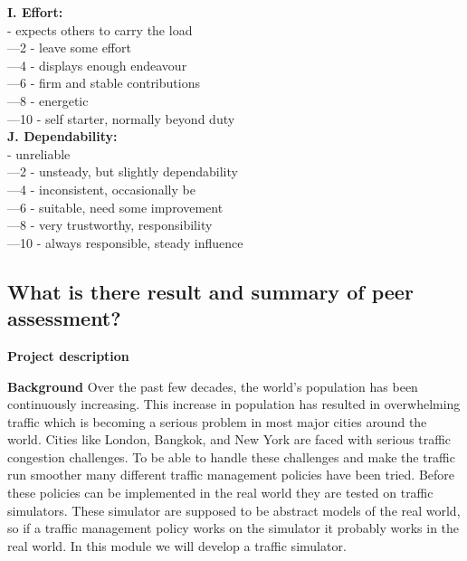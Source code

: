 \documentclass[11pt]{article}
\begin{document}
\textbf{I. Effort:}\\
	\indent{}	- expects others to carry the load\\
	\indent{}—2	- leave some effort\\
	\indent{}—4	- displays enough endeavour\\
	\indent{}—6	- firm and stable contributions\\
	\indent{}—8	- energetic\\
	\indent{}—10	- self starter, normally beyond duty\\

\textbf{J. Dependability:}\\ 
	\indent{}	- unreliable\\
	\indent{}—2	- unsteady, but slightly dependability \\
	\indent{}—4	- inconsistent, occasionally be\\
	\indent{}—6	- suitable, need some improvement \\
	\indent{}—8	- very trustworthy, responsibility \\
	\indent{}—10	- always responsible, steady influence \\
	\subsection{What is there result and summary of peer assessment?}

\newpage	



\appendix %






\textbf{Project description}


\textbf{Background}
Over the past few decades, the world's population has been continuously increasing. This increase in population has resulted in overwhelming traffic which is becoming a serious problem in most major cities around the world. Cities like London, Bangkok, and New York are faced with serious traffic congestion challenges. To be able to handle these challenges and make the traffic run smoother many different traffic management policies have been tried. Before these policies can be implemented in the real world they are tested on traffic simulators. These simulator are supposed to be abstract models of the real world, so if a traffic management policy works on the simulator it probably works in the real world. In this module we will develop a traffic simulator.
\end{document}
